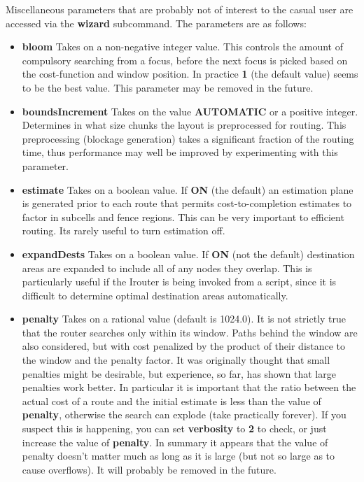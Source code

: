 \documentclass[letterpaper,twoside,12pt]{article}
\begin{document}
Miscellaneous parameters that are probably not of interest 
to the casual user are
accessed via the {\bfseries wizard} subcommand.  The parameters are as follows:

\begin{itemize}
\item {\bfseries bloom}
Takes on a non-negative integer value.  This controls the amount of
compulsory searching from a focus, before the next focus is picked
based on the cost-function and window position.  In practice {\bfseries 1} 
(the default value)
seems to be the best value.  This parameter may be removed in the future.

\item {\bfseries boundsIncrement}
Takes on the value {\bfseries AUTOMATIC} or a positive integer.  Determines in
what size chunks the layout is preprocessed for routing.  This
preprocessing (blockage generation) takes a significant fraction of the
routing time, thus performance may well be improved by experimenting with
this parameter.

\item {\bfseries estimate}
Takes on a boolean value.  If {\bfseries ON} (the default) an estimation plane 
is generated prior to each route that permits 
cost-to-completion estimates to factor in subcells and fence regions.  This
can be very important to efficient routing.  Its rarely useful to turn
estimation off.

\item {\bfseries expandDests}
Takes on a boolean value.  If {\bfseries ON} (not the default) destination areas
are expanded to include all of any nodes they overlap.  This is particularly
useful if the Irouter is being invoked from a script, since it is 
difficult to determine optimal destination areas automatically.

\item {\bfseries penalty}
Takes on a rational value (default is 1024.0).  It is not strictly
true that the router searches only within its window.  Paths behind
the window are also considered, but with cost penalized by the 
product of their distance to the window
and the penalty factor.  It was originally thought that small
penalties might be desirable, but experience, so far, has shown that large
penalties work better.  In particular it is important that the ratio between
the actual cost of a route and the initial estimate is less than the
value of {\bfseries penalty}, otherwise the search can explode (take 
practically forever).  If you suspect this is happening, you can set
{\bfseries verbosity} to {\bfseries 2} to check, or just increase the value
of {\bfseries penalty}.  In summary it appears that the value of penalty doesn't
matter much as long as it is large (but not so large as to cause 
overflows).  It will probably be removed in the future.


\end{itemize}
\end{document}
